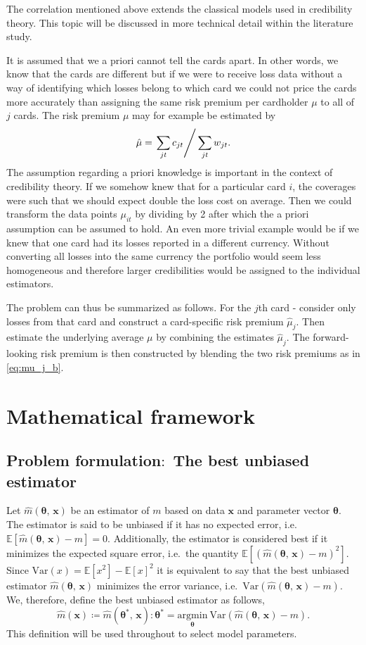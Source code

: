 \documentclass[11pt]{article}
\theoremstyle{definition}
\begin{document}
The correlation mentioned above extends the classical models used in credibility theory. This topic will be discussed in more technical detail within the literature study.

It is assumed that we a priori cannot tell the cards apart. In other words, we know that the cards are different but if we were to receive loss data without a way of identifying which losses belong to which card we could not price the cards more accurately than assigning the same risk premium per cardholder $\mu$ to all of $j$ cards. The risk premium $\mu$ may for example be estimated by
\begin{equation*}
    \hat\mu = \left. \sum_{jt} c_{jt} \right/ \sum_{jt} w_{jt}.
\end{equation*}
The assumption regarding a priori knowledge is important in the context of credibility theory. If we somehow knew that for a particular card $i$, the coverages were such that we should expect double the loss cost on average. Then we could transform the data points $\mu_{it}$ by dividing by 2 after which the a priori assumption can be assumed to hold. An even more trivial example would be if we knew that one card had its losses reported in a different currency. Without converting all losses into the same currency the portfolio would seem less homogeneous and therefore larger credibilities would be assigned to the individual estimators.

The problem can thus be summarized as follows. For the $j$th card - consider only losses from that card and construct a card-specific risk premium $\hat\mu_j$. Then estimate the underlying average $\mu$ by combining the estimates $\hat\mu_j$. The forward-looking risk premium is then constructed by blending the two risk premiums as in \eqref{eq:mu_j_b}.

\newpage
\section{Mathematical framework}
\subsection{Problem formulation$\colon$ The best unbiased estimator}
Let $\hat m(\bm\theta,\, \bm x)$ be an estimator of $m$ based on data $\bm x$ and parameter vector $\bm\theta$. The estimator is said to be unbiased if it has no expected error, i.e.\ $\mathds{E}[\hat m(\bm\theta,\, \bm x) - m]=0$. Additionally, the estimator is considered best if it minimizes the expected square error, i.e.\ the quantity $\mathds{E}[(\hat m(\bm\theta,\, \bm x) - m)^2]$. Since $\text{Var}(x)=\mathds{E}[x^2]-\mathds{E}[x]^2$ it is equivalent to say that the best unbiased estimator $\hat m(\bm\theta,\, \bm x)$ minimizes the error variance, i.e.\ $\text{Var}(\hat m(\bm\theta,\, \bm x)-m)$. We, therefore, define the best unbiased estimator as follows,
\begin{equation}\label{eq:general_best}
    \hat m(\bm x) \coloneqq \hat m(\bm\theta^{*},\, \bm x) : \bm\theta^{*} = \underset{\bm \theta}{\text{argmin}}\: \text{Var}(\hat m(\bm\theta,\, \bm x) - m).
\end{equation}
This definition will be used throughout to select model parameters.
\end{document}
